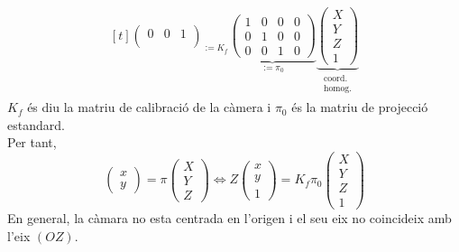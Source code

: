 \documentclass[../main.tex]{subfiles}
\begin{document}
\begin{displaymath}
\begin{aligned}[t]
{\begin{pmatrix}
				0 & 0 & 1\\
				\end{pmatrix}}_{:= K_f}
				\underbrace{\begin{pmatrix}
				1 & 0 & 0 & 0\\
				0 & 1 & 0 & 0\\
				0 & 0 & 1 & 0
				\end{pmatrix}}_{:= \pi_0}
				\underbrace{\begin{pmatrix}
				X\\Y\\Z\\1
				\end{pmatrix}}_{\substack{\text{coord.}\\ \text{homog.}}}
		\end{aligned}
	\end{displaymath}
	$K_f$ és diu la matriu de calibració de la càmera i $\pi_0$ és la matriu de projecció estandard.\\
	Per tant,
	\begin{displaymath}
		\begin{pmatrix}
			x\\y
		\end{pmatrix} = \pi\begin{pmatrix}
			X\\Y\\Z
		\end{pmatrix} \iff Z\begin{pmatrix}
			x\\y\\1
		\end{pmatrix} = K_f\pi_0\begin{pmatrix}
			X\\Y\\Z\\1
		\end{pmatrix}
	\end{displaymath}
	En general, la càmara no esta centrada en l'origen i el seu eix no coincideix amb l'eix $(OZ)$.\\
\end{document}
